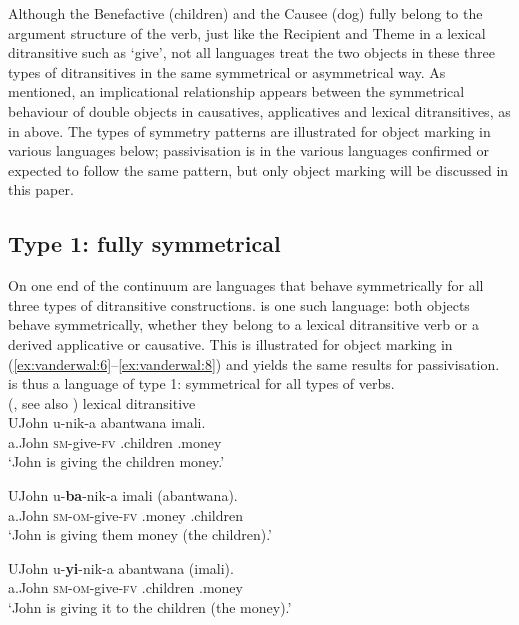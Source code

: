 \documentclass[output=paper]{LSP/langsci}
\begin{document}
Although the Benefactive (children) and the Causee (dog) fully belong to the argument structure of the verb, just like the Recipient and Theme in a lexical ditransitive such as ‘give’, not all languages treat the two objects in these three types of ditransitives in the same symmetrical or asymmetrical way. As mentioned, an implicational relationship appears between the symmetrical behaviour of double objects in causatives, applicatives and lexical ditransitives, as in  above. The types of symmetry patterns are illustrated for object marking in various languages below; passivisation is in the various languages confirmed or expected to follow the same pattern, but only object marking will be discussed in this paper.

\subsection{Type 1: fully symmetrical}\label{sec:vdw:2.1}

On one end of the continuum are languages that behave symmetrically for all three types of ditransitive constructions.  is one such language: both objects behave symmetrically, whether they belong to a lexical ditransitive verb or a derived applicative or causative. This is illustrated for object marking in (\ref{ex:vanderwal:6}--\ref{ex:vanderwal:8}) and yields the same results for passivisation.  is thus a language of type 1: symmetrical for all types of verbs.\\


\noindent {} (\citealt{Zeller2011}, see also \citealt{Zeller2012})
\ea\label{ex:vanderwal:6}{lexical ditransitive}\\%
 \ea\label{ex:vanderwal:6a} 
\gll UJohn  u-nik-a  abantwana  imali.\\
    a.John  \textsc{sm}{}-give-\textsc{fv}  .children  .money\\
    \glt ‘John is giving the children money.’

 \ex\label{ex:vanderwal:6b}
\gll UJohn  u-\textbf{ba}{}-nik-a  imali  (abantwana). \\
    a.John  \textsc{sm}{}-\textsc{om}{}-give-\textsc{fv}  .money  .children\\
    \glt ‘John is giving them money (the children).’

 \ex\label{ex:vanderwal:6c}
\gll UJohn  u-\textbf{yi}{}-nik-a  abantwana   (imali). \\
    a.John  \textsc{sm-om}{}-give-\textsc{fv}  .children  .money \\
    \glt ‘John is giving it to the children (the money).’
\z
\z
\end{document}
